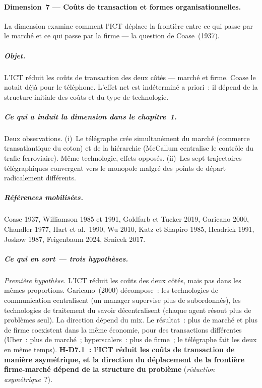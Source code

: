 \paragraph{Dimension~7 --- Co\^uts de transaction et formes organisationnelles.}
La dimension examine comment l'ICT d\'eplace la fronti\`ere entre ce qui passe par le march\'e et ce qui passe par la firme --- la question de Coase~(1937).

\subparagraph{Objet.}
L'ICT r\'eduit les co\^uts de transaction des deux c\^ot\'es --- march\'e et firme. Coase le notait d\'ej\`a pour le t\'el\'ephone. L'effet net est ind\'etermin\'e a priori~: il d\'epend de la structure initiale des co\^uts et du type de technologie.

\subparagraph{Ce qui a induit la dimension dans le chapitre~1.}
Deux observations. (i)~Le t\'el\'egraphe cr\'ee simultan\'ement du march\'e (commerce transatlantique du coton) et de la hi\'erarchie (McCallum centralise le contr\^ole du trafic ferroviaire). M\^eme technologie, effets oppos\'es. (ii)~Les sept trajectoires t\'el\'egraphiques convergent vers le monopole malgr\'e des points de d\'epart radicalement diff\'erents.

\subparagraph{R\'ef\'erences mobilis\'ees.}
Coase 1937, Williamson 1985 et 1991, Goldfarb et Tucker 2019, Garicano 2000, Chandler 1977, Hart et al.\ 1990, Wu 2010, Katz et Shapiro 1985, Headrick 1991, Joskow 1987, Feigenbaum 2024, Srnicek 2017.

\subparagraph{Ce qui en sort --- trois hypoth\`eses.}

\emph{Premi\`ere hypoth\`ese.} L'ICT r\'eduit les co\^uts des deux c\^ot\'es, mais pas dans les m\^emes proportions. Garicano~(2000) d\'ecompose~: les technologies de communication centralisent (un manager supervise plus de subordonn\'es), les technologies de traitement du savoir d\'ecentralisent (chaque agent r\'esout plus de probl\`emes seul). La direction d\'epend du mix. Le r\'esultat~: plus de march\'e et plus de firme coexistent dans la m\^eme \'economie, pour des transactions diff\'erentes (Uber~: plus de march\'e~; hyperscalers~: plus de firme~; le t\'el\'egraphe fait les deux en m\^eme temps). \textbf{H-D7.1~: l'ICT r\'eduit les co\^uts de transaction de mani\`ere asym\'etrique, et la direction du d\'eplacement de la fronti\`ere firme-march\'e d\'epend de la structure du probl\`eme} (\emph{r\'eduction asym\'etrique}~?).

